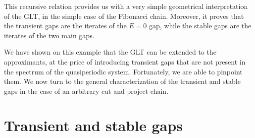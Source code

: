 \documentclass[a4paper]{jpconf}
\begin{document}
This recursive relation provides us with a very simple geometrical interpretation of the GLT, in the simple case of the Fibonacci chain.
Moreover, it proves that the transient gaps are the iterates of the $E=0$ gap, while the stable gaps are the iterates of the two main gaps.

We have shown on this example that the GLT can be extended to the approximants, at the price of introducing transient gaps that are not present in the spectrum of the quasiperiodic system. 
Fortunately, we are able to pinpoint them.
We now turn to the general characterization of the transient and stable gaps in the case of an arbitrary cut and project chain.
\section{Transient and stable gaps}
\end{document}

